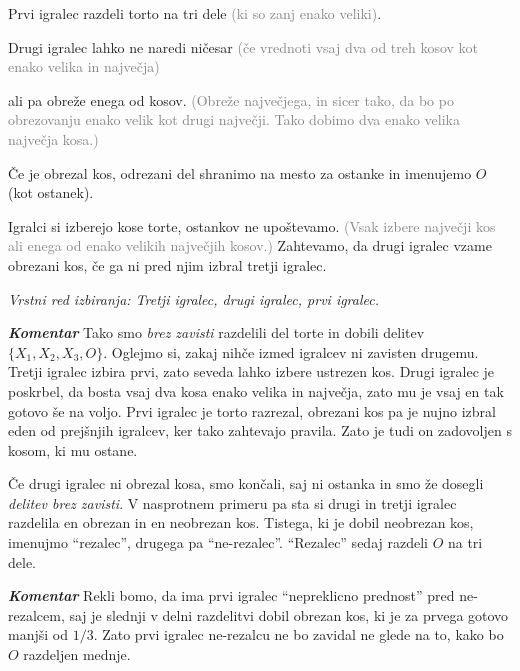 \documentclass[a4paper,12pt]{article}
\begin{document}
\begin{protokol}

\item Prvi igralec razdeli torto na tri dele \textcolor{gray}{(ki so zanj enako veliki)}.

\item Drugi igralec lahko ne naredi ničesar \textcolor{gray}{(če vrednoti vsaj dva od treh kosov kot enako velika in največja)}

ali pa obreže enega od kosov. \textcolor{gray}{(Obreže največjega, in sicer tako, da bo po obrezovanju enako velik kot drugi največji. Tako dobimo dva enako velika največja kosa.)}

Če je obrezal kos, odrezani del shranimo na mesto za ostanke in imenujemo $O$ (kot ostanek).

\item Igralci si izberejo kose torte, ostankov ne upoštevamo. \textcolor{gray}{(Vsak izbere največji kos ali enega od enako velikih največjih kosov.)} Zahtevamo, da drugi igralec vzame obrezani kos, če ga ni pred njim izbral tretji igralec.

\textsl{Vrstni red izbiranja: Tretji igralec, drugi igralec, prvi igralec.}

\item [\textbf{\em Komentar}] Tako smo {\em brez zavisti} razdelili del torte in dobili delitev ${\{X_1, X_2, X_3, O\}}$. Oglejmo si, zakaj nihče izmed igralcev ni zavisten drugemu. Tretji igralec izbira prvi, zato seveda lahko izbere ustrezen kos. Drugi igralec je poskrbel, da bosta vsaj dva kosa enako velika in največja, zato mu je vsaj en tak gotovo še na voljo. Prvi igralec je torto razrezal, obrezani kos pa je nujno izbral eden od prejšnjih igralcev, ker tako zahtevajo pravila. Zato je tudi on zadovoljen s kosom, ki mu ostane.

\item Če drugi igralec ni obrezal kosa, smo končali, saj ni ostanka in smo že dosegli {\em delitev brez zavisti}. V nasprotnem primeru pa sta si drugi in tretji igralec razdelila en obrezan in en neobrezan kos. Tistega, ki je dobil neobrezan kos, imenujmo ``rezalec'', drugega pa ``ne-rezalec''. ``Rezalec'' sedaj razdeli $O$ na tri dele.

\item [\textbf{\em Komentar}] Rekli bomo, da ima prvi igralec ``nepreklicno prednost'' pred ne-rezalcem, saj je slednji v delni razdelitvi dobil obrezan kos, ki je za prvega gotovo manjši od $1/3$. Zato prvi igralec ne-rezalcu ne bo zavidal ne glede na to, kako bo $O$ razdeljen mednje.


\end{protokol}
\end{document}
